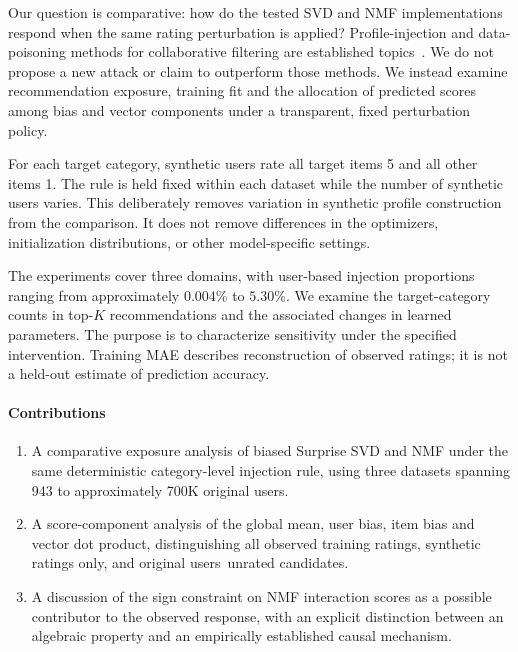 \documentclass[information,article,submit,pdftex,moreauthors]{Definitions/mdpi}
\newif\ifrevisionnotes
\newcommand{\saracomment}[1]{\ifrevisionnotes\par\smallskip\noindent\textcolor{orange}{\textbf{Sara:} #1}\par\smallskip\fi}
\begin{document}
Our question is comparative: how do the tested SVD and NMF implementations respond when the same rating perturbation is applied? Profile-injection and data-poisoning methods for collaborative filtering are established topics~\cite{li2016data,nguyen2024manipulating,wang2024poisoning}. We do not propose a new attack or claim to outperform those methods. We instead examine recommendation exposure, training fit and the allocation of predicted scores among bias and vector components under a transparent, fixed perturbation policy.

For each target category, synthetic users rate all target items 5 and all other items 1. The rule is held fixed within each dataset while the number of synthetic users varies. This deliberately removes variation in synthetic profile construction from the comparison. It does not remove differences in the optimizers, initialization distributions, or other model-specific settings.

The experiments cover three domains, with user-based injection proportions ranging from approximately $0.004\%$ to $5.30\%$. We examine the target-category counts in top-$K$ recommendations and the associated changes in learned parameters. The purpose is to characterize sensitivity under the specified intervention. Training MAE describes reconstruction of observed ratings; it is not a held-out estimate of prediction accuracy.

\saracomment{Revised the positioning and contributions: this is an exposure and parameter-response comparison, not a new poisoning attack. The empirical findings are separated from hypotheses about their cause.}

\paragraph{Contributions}
\begin{enumerate}
\item A comparative exposure analysis of biased Surprise SVD and NMF under the same deterministic category-level injection rule, using three datasets spanning 943 to approximately 700K original users.
\item A score-component analysis of the global mean, user bias, item bias and vector dot product, distinguishing all observed training ratings, synthetic ratings only, and original users\textquotesingle\ unrated candidates.
\item A discussion of the sign constraint on NMF interaction scores as a possible contributor to the observed response, with an explicit distinction between an algebraic property and an empirically established causal mechanism.
\end{enumerate}
\end{document}
